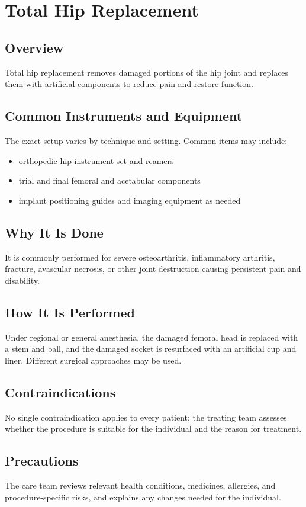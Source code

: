 \chapter{Total Hip Replacement}

\section*{Overview}
Total hip replacement removes damaged portions of the hip joint and replaces them with artificial components to reduce pain and restore function.

\section*{Common Instruments and Equipment}
The exact setup varies by technique and setting. Common items may include:
\begin{itemize}[nosep,leftmargin=*]
  \item orthopedic hip instrument set and reamers
  \item trial and final femoral and acetabular components
  \item implant positioning guides and imaging equipment as needed
\end{itemize}

\section*{Why It Is Done}
It is commonly performed for severe osteoarthritis, inflammatory arthritis, fracture, avascular necrosis, or other joint destruction causing persistent pain and disability.

\section*{How It Is Performed}
Under regional or general anesthesia, the damaged femoral head is replaced with a stem and ball, and the damaged socket is resurfaced with an artificial cup and liner. Different surgical approaches may be used.

\section*{Contraindications}
No single contraindication applies to every patient; the treating team assesses whether the procedure is suitable for the individual and the reason for treatment.

\section*{Precautions}
The care team reviews relevant health conditions, medicines, allergies, and procedure-specific risks, and explains any changes needed for the individual.

